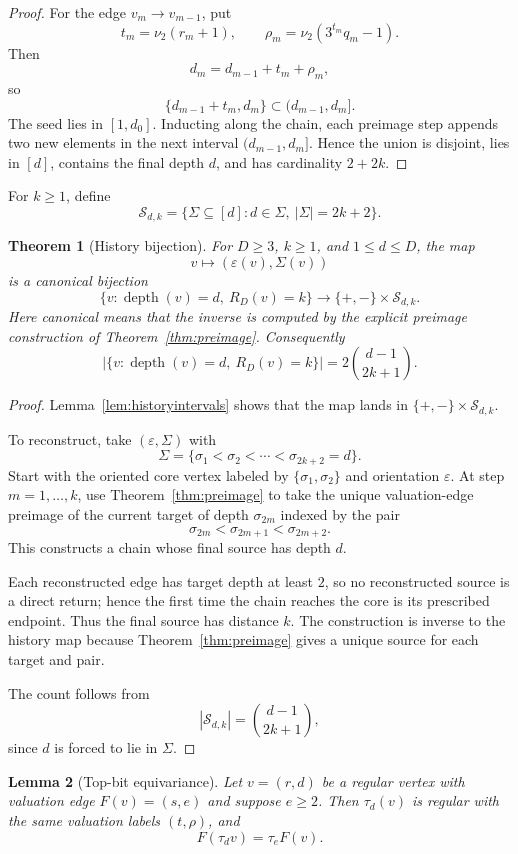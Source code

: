 \documentclass[11pt]{amsart}
\newtheorem{theorem}{Theorem}[section]
\newtheorem{lemma}[theorem]{Lemma}
\theoremstyle{definition}
\theoremstyle{remark}
\newcommand{\nuu}{\nu_2}
\newcommand{\depth}{\operatorname{depth}}
\newcommand{\Sfam}{\mathcal S}
\newcommand{\eps}{\varepsilon}
\begin{document}
\begin{proof}
For the edge $v_m\to v_{m-1}$, put
\[
t_m=\nuu(r_m+1),\qquad \rho_m=\nuu(3^{t_m}q_m-1).
\]
Then
\[
d_m=d_{m-1}+t_m+\rho_m,
\]
so
\[
\{d_{m-1}+t_m,d_m\}\subset(d_{m-1},d_m].
\]
The seed lies in $[1,d_0]$.  Inducting along the chain, each preimage step appends two new elements in the next interval $(d_{m-1},d_m]$.  Hence the union is disjoint, lies in $[d]$, contains the final depth $d$, and has cardinality $2+2k$.
\end{proof}

For $k\ge1$, define
\[
\Sfam_{d,k}=\{\Sigma\subseteq[d]:d\in\Sigma,\ |\Sigma|=2k+2\}.
\]

\begin{theorem}[History bijection]\label{thm:bijection}
For $D\ge3$, $k\ge1$, and $1\le d\le D$, the map
\[
v\longmapsto (\eps(v),\Sigma(v))
\]
is a canonical bijection
\[
\{v:\depth(v)=d,\ R_D(v)=k\}
\longrightarrow
\{+,-\}\times\Sfam_{d,k}.
\]
Here canonical means that the inverse is computed by the explicit preimage construction of Theorem~\ref{thm:preimage}.  Consequently
\[
\bigl|\{v:\depth(v)=d,\ R_D(v)=k\}\bigr|=2\binom{d-1}{2k+1}.
\]
\end{theorem}

\begin{proof}
Lemma~\ref{lem:historyintervals} shows that the map lands in $\{+,-\}\times\Sfam_{d,k}$.

To reconstruct, take $(\eps,\Sigma)$ with
\[
\Sigma=\{\sigma_1<\sigma_2<\cdots<\sigma_{2k+2}=d\}.
\]
Start with the oriented core vertex labeled by $\{\sigma_1,\sigma_2\}$ and orientation $\eps$.  At step $m=1,\ldots,k$, use Theorem~\ref{thm:preimage} to take the unique valuation-edge preimage of the current target of depth $\sigma_{2m}$ indexed by the pair
\[
\sigma_{2m}<\sigma_{2m+1}<\sigma_{2m+2}.
\]
This constructs a chain whose final source has depth $d$.

Each reconstructed edge has target depth at least $2$, so no reconstructed source is a direct return; hence the first time the chain reaches the core is its prescribed endpoint.  Thus the final source has distance $k$.  The construction is inverse to the history map because Theorem~\ref{thm:preimage} gives a unique source for each target and pair.

The count follows from
\[
|\Sfam_{d,k}|=\binom{d-1}{2k+1},
\]
since $d$ is forced to lie in $\Sigma$.
\end{proof}

\begin{lemma}[Top-bit equivariance]\label{lem:topbit}
Let $v=(r,d)$ be a regular vertex with valuation edge $F(v)=(s,e)$ and suppose $e\ge2$.  Then $\tau_d(v)$ is regular with the same valuation labels $(t,\rho)$, and
\[
F(\tau_d v)=\tau_e F(v).
\]
\end{lemma}
\end{document}
